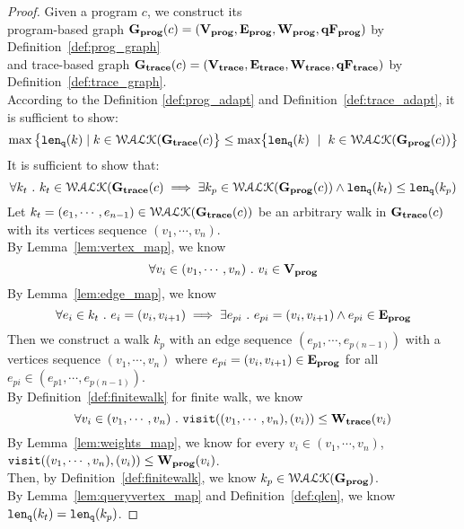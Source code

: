 \begin{proof}
Given a program ${c}$, 
we construct its 
\\
program-based graph $\mathtt{\bf{G_{prog}}}({c}) = (\mathtt{\bf{V_{prog}}}, \mathtt{\bf{E_{prog}}}, \mathtt{\bf{W_{prog}}}, \mathtt{\bf{qF_{prog}}})$
by Definition~\ref{def:prog_graph}
\\ and 
trace-based graph $\mathtt{\bf{G_{trace}}}({c}) = (\mathtt{\bf{V_{trace}}}, \mathtt{\bf{E_{trace}}}, \mathtt{\bf{W_{trace}}}, \mathtt{\bf{qF_{trace}}})$  by Definition~\ref{def:trace_graph}.
\\
According to the Definition \ref{def:prog_adapt} and Definition~\ref{def:trace_adapt}, it is sufficient to show:
%
$$
\max \big 
\{ \qlen(k) \mid k \in \walks(\traceG(c) \big \} 
\leq
\max\left\{ \qlen(k) \ \mid \  k\in \walks(\progG({c}))\right \}
$$
%
%
It is sufficient to show that:
\[
  \forall k_t ~.~ 
  k_t \in \mathcal{WALK}(\mathtt{\bf{G_{trace}}}({c}) \implies
  \exists k_p \in \mathcal{WALK}(\mathtt{\bf{G_{prog}}}({c})) \land 
  \mathtt{len}_{\tt q}(k_t) \leq \mathtt{len}_{\tt q}(k_p)
\]
%
Let $k_t = (e_1, \cdots, e_{n-1}) \in \mathcal{WALK}(\mathtt{\bf{G_{trace}}}(c))$ be an arbitrary walk in $\mathtt{\bf{G_{trace}}}(c)$ with its vertices sequence 
$(v_1, \cdots, v_n)$.
\\
By Lemma~\ref{lem:vertex_map},
we know 
\[
  \forall v_i \in (v_1, \cdots, v_n) ~.~ v_i \in \mathtt{\bf{V_{prog}}}
  \]
%
By Lemma~\ref{lem:edge_map}, we know
%
\[
  \forall e_i \in k_t ~.~ e_i = (v_i, v_{i + 1}) \implies
  \exists e_{pi} ~.~ e_{pi} = (v_i, v_{i + 1}) \land e_{pi} \in \mathtt{\bf{E_{prog}}}
  \]
Then we construct a walk $k_p$ with an edge sequence $(e_{p1}, \cdots, e_{p(n-1)}) $ 
with a vertices sequence $(v_1, \cdots, v_n)$ where 
$e_{pi} = (v_i, v_{i + 1}) \in \mathtt{\bf{E_{prog}}}$ for all $e_{pi} \in (e_{p1}, \cdots, e_{p(n-1)})$.
\\
By Definition~\ref{def:finitewalk} for finite walk, 
we know
\[
  \forall v_i \in (v_1, \cdots, v_n) ~.~
  \mathtt{visit}((v_1, \cdots, v_n), (v_i)) \leq \mathtt{\bf{W_{trace}}}(v_i)
\]
%
By Lemma~\ref{lem:weights_map}, we know for every $ v_i \in (v_1, \cdots, v_n)$,
$\mathtt{visit}((v_1, \cdots, v_n), (v_i)) \leq \mathtt{\bf{W_{prog}}}(v_i)$.
\\
Then, by Definition~\ref{def:finitewalk}, we know $k_p \in \mathcal{WALK}(\mathtt{\bf{G_{prog}}})$.
\\
By Lemma~\ref{lem:queryvertex_map} and Definition~\ref{def:qlen}, we know $\mathtt{len}_{\tt q}(k_t) = \mathtt{len}_{\tt q}(k_p)$.

\end{proof}
